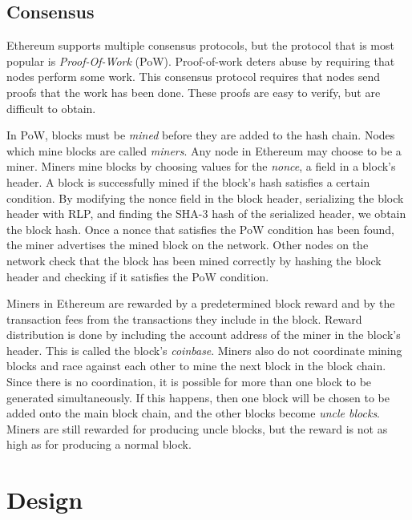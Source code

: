 \documentclass[12pt]{article}
\newcounter{protocol}
\begin{document}
\subsection{Consensus} \label{subsection:consensus}
Ethereum supports multiple consensus protocols, but the protocol that is most popular is \emph{Proof-Of-Work} (PoW). Proof-of-work deters abuse by requiring that nodes perform some work. This consensus protocol requires that nodes send proofs that the work has been done. These proofs are easy to verify, but are difficult to obtain.


In PoW, blocks must be \emph{mined} before they are added to the hash chain. Nodes which mine blocks are called \emph{miners}. Any node in Ethereum may choose to be a miner.
Miners mine blocks by choosing values for the \emph{nonce}, a field in a block's header. A block is successfully mined if the block's hash satisfies a certain condition. By modifying the nonce field in the block header, serializing the block header with RLP, and finding the SHA-3 hash of the serialized header, we obtain the block hash. Once a nonce that satisfies the PoW condition has been found, the miner advertises the mined block on the network. Other nodes on the network check that the block has been mined correctly by hashing the block header and checking if it satisfies the PoW condition.

Miners in Ethereum are rewarded by a predetermined block reward and by the transaction fees from the transactions they include in the block. Reward distribution is done by including the account address of the miner in the block's header. This is called the block's \emph{coinbase}. Miners also do not coordinate mining blocks and race against each other to mine the next block in the block chain. Since there is no coordination, it is possible for more than one block to be generated simultaneously. If this happens, then one block will be chosen to be added onto the main block chain, and the other blocks become \emph{uncle blocks}. Miners are still rewarded for producing uncle blocks, but the reward is not as high as for producing a normal block.


\section{Design}
\end{document}
